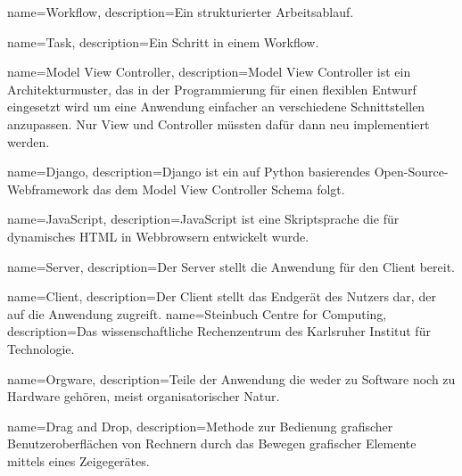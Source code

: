 
%


{
    name=Workflow,
    description={Ein strukturierter Arbeitsablauf.}
}

{
    name=Task,
    description={Ein Schritt in einem Workflow.}
}





{
    name=Model View Controller,
    description={Model View Controller ist ein Architekturmuster, das in der Programmierung für einen flexiblen Entwurf eingesetzt wird um eine Anwendung einfacher an verschiedene Schnittstellen anzupassen. Nur View und Controller müssten dafür dann neu implementiert werden.}
}

{
    name=Django,
    description={Django ist ein auf Python basierendes Open-Source-Webframework das dem \Gls{Model View Controller} Schema folgt.}
}

{
    name=JavaScript,
    description={JavaScript ist eine Skriptsprache die für dynamisches HTML in Webbrowsern entwickelt wurde.}
}

{
    name=Server,
    description={Der Server stellt die Anwendung für den Client bereit.}
}

{
    name=Client,
    description={Der Client stellt das Endgerät des Nutzers dar, der auf die Anwendung zugreift.}
}
{
    name=Steinbuch Centre for Computing,
    description={Das wissenschaftliche Rechenzentrum des Karlsruher Institut für Technologie.}
}

{
    name=Orgware,
    description={Teile der Anwendung die weder zu Software noch zu Hardware gehören, meist organisatorischer Natur.}
}


{
    name=Drag and Drop,
    description={Methode zur Bedienung grafischer Benutzeroberflächen von Rechnern durch das Bewegen grafischer Elemente mittels eines Zeigegerätes.}
}

